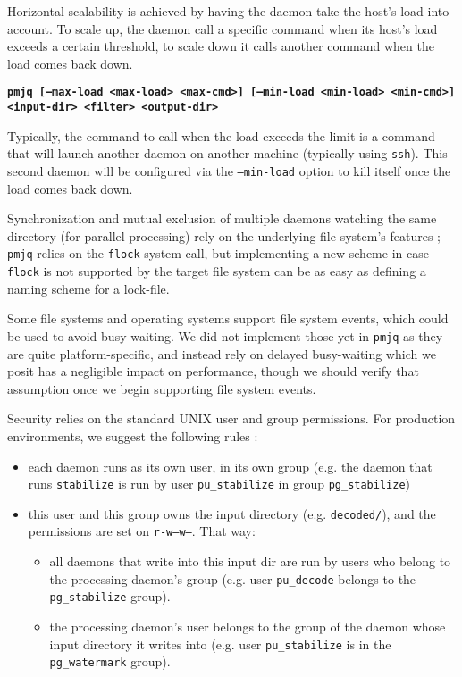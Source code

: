 \documentclass[letterpaper,twocolumn,10pt]{article}
\begin{document}
Horizontal scalability is achieved by having the daemon take the host's load into account. To scale up, the daemon call a specific command when its host's load exceeds a certain threshold, to scale down it calls another command when the load comes back down.

   {\bf \tt pmjq [--max-load <max-load> <max-cmd>] [--min-load <min-load> <min-cmd>] <input-dir> <filter> <output-dir> \\}

Typically, the command to call when the load exceeds the limit is a command that will launch another daemon on another machine (typically using {\tt ssh}). This second daemon will be configured via the {\tt --min-load} option to kill itself once the load comes back down.

Synchronization and mutual exclusion of multiple daemons watching the same directory (for parallel processing) rely on the underlying file system's features ; {\tt pmjq} relies on the {\tt flock} system call, but implementing a new scheme in case {\tt flock} is not supported by the target file system can be as easy as defining a naming scheme for a lock-file.

Some file systems and operating systems support file system events, which could be used to avoid busy-waiting. We did not implement those yet in {\tt pmjq} as they are quite platform-specific, and instead rely on delayed busy-waiting which we posit has a negligible impact on performance, though we should verify that assumption once we begin supporting file system events.

Security relies on the standard UNIX user and group permissions. For production environments, we suggest the following rules :
\begin{itemize}
\item each daemon runs as its own user, in its own group (e.g. the daemon that runs {\tt stabilize} is run by user {\tt pu\_stabilize} in group {\tt pg\_stabilize})
\item this user and this group owns the input directory (e.g. {\tt decoded/}), and the permissions are set on {\tt r-w--w---}. That way:
  \begin{itemize}
  \item all daemons that write into this input dir are run by users who belong to the processing daemon's group (e.g. user {\tt pu\_decode} belongs to the {\tt pg\_stabilize} group).
  \item the processing daemon's user belongs to the group of the daemon whose input directory it writes into (e.g. user {\tt pu\_stabilize} is in the {\tt pg\_watermark} group).
  \end{itemize}
\end{itemize}
\end{document}
